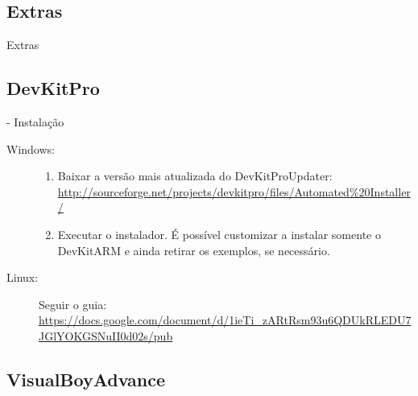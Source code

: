 \documentclass{beamer}
\begin{document}
\begin{darkframes}
\section{Extras}

\begin{frame}{}
    \begin{center}
        \huge Extras
    \end{center}
\end{frame}

\subsection{DevKitPro}

\begin{frame}{\subsecname - Instalação}
    \begin{description}
        \item[Windows:]
            \begin{enumerate}
                \item Baixar a versão mais atualizada do DevKitProUpdater:
                    \url{http://sourceforge.net/projects/devkitpro/files/Automated\%20Installer/}
                \item Executar o instalador. É possível customizar a instalar
                    somente o DevKitARM e ainda retirar os exemplos, se
                    necessário.
            \end{enumerate}
        \item[Linux:]
            Seguir o guia:
            \url{https://docs.google.com/document/d/1ieTi_zARtRsm93u6QDUkRLEDU7JGlYOKGSNuII0d02s/pub}
    \end{description}
\end{frame}

\subsection{VisualBoyAdvance}


\end{darkframes}
\end{document}
